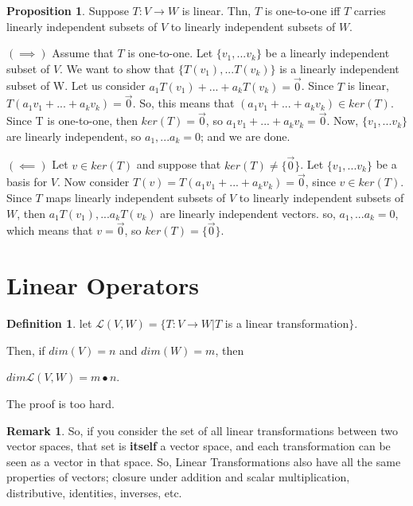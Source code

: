 \documentclass[a5paper]{article}
\makeatletter
\renewenvironment{proof}{{\bfseries Proof}}{\qed}
\renewenvironment{proof}[1][\bfseries \proofname]{\par
  \pushQED{\qed}%
  \normalfont \topsep6\p@\@plus6\p@\relax
  \trivlist
  \item[\hskip\labelsep
        \scshape
    #1\@addpunct{}]\ignorespaces
}{%
  \popQED\endtrivlist\@endpefalse
}
\theoremstyle{definition}%
\numberwithin{theorem}{section} %
\newtheorem{definition}[theorem]{Definition}
\newtheorem{proposition}[theorem]{Proposition}
\newtheorem{remark}[theorem]{Remark}
\makeatother
\begin{document}
\begin{proposition}
Suppose $T: V \to W$ is linear. Thn, $T$ is one-to-one iff $T$ carries linearly independent subsets of $V$ to linearly independent subsets of $W$. 

\begin{proof}
$(\implies)$ Assume that $T$ is one-to-one. Let $\{v_1, ... v_k\}$ be a linearly independent subset of $V$. We want to show that $\{T(v_1), ... T(v_k)\}$ is a linearly independent subset of W. Let us consider $a_1T(v_1)+ ... + a_k T(v_k) = \vec{0}$. Since $T$ is linear, $T(a_1v_1+ ... + a_kv_k) = \vec{0}$. So, this means that $(a_1v_1+ ... + a_kv_k) \in ker(T)$. Since T is one-to-one, then $ker(T) = \vec{0}$, so $a_1v_1+ ... + a_kv_k = \vec{0}$. Now, $\{v_1, ... v_k\}$ are linearly independent, so $a_1, ... a_k = 0$; and we are done.
\end{proof}

\begin{proof}
$(\impliedby)$
Let $v \in ker(T)$ and suppose that $ker(T) \neq \{\vec{0}\}$. Let $\{v_1, ... v_k\}$ be a basis for $V$. Now consider $T(v) = T(a_1v_1+ ... + a_kv_k) = \vec{0}$, since $v \in ker(T)$. Since $T$ maps linearly independent subsets of $V$ to linearly independent subsets of $W$, then $a_1T(v_1), ... a_k T(v_k)$ are linearly independent vectors. so, $a_1, ... a_k = 0$, which means that $v = \vec{0}$, so $ker(T) = \{\vec{0}\}$.
\end{proof}
\end{proposition}

\section{Linear Operators}

\begin{definition}
let $\mathcal{L}(V,W) = \{T:V \to W | T$ is a linear transformation$\}$. 

Then, if $dim(V) = n$ and $dim(W) = m$, then 

$dim\mathcal{L}(V,W) = m \bullet n$. 

\begin{proof}
The proof is too hard. 
\end{proof}
\end{definition}

\begin{remark}
So, if you consider the set of all linear transformations between two vector spaces, that set is \textbf{itself} a vector space, and each transformation can be seen as a vector in that space. So, Linear Transformations also have all the same properties of vectors; closure under addition and scalar multiplication, distributive, identities, inverses, etc. 
\end{remark}
\end{document}
